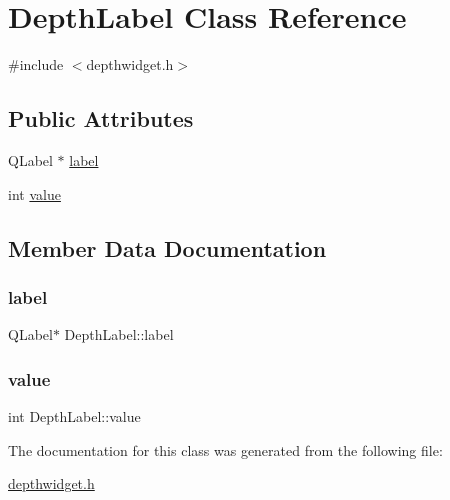 \hypertarget{class_depth_label}{}\section{Depth\+Label Class Reference}
\label{class_depth_label}


{\ttfamily \#include $<$depthwidget.\+h$>$}

\subsection*{Public Attributes}
\begin{DoxyCompactItemize}
\item 
Q\+Label $\ast$ \mbox{\hyperlink{class_depth_label_a088e21b75c822379eb2b853fbfd6c918}{label}}
\item 
int \mbox{\hyperlink{class_depth_label_a3e25eb8a8714546d633315adbe1cb446}{value}}
\end{DoxyCompactItemize}


\subsection{Member Data Documentation}
\mbox{\label{class_depth_label_a088e21b75c822379eb2b853fbfd6c918}} 
\subsubsection{\texorpdfstring{label}{label}}
{\footnotesize\ttfamily Q\+Label$\ast$ Depth\+Label\+::label}

\mbox{\label{class_depth_label_a3e25eb8a8714546d633315adbe1cb446}} 
\subsubsection{\texorpdfstring{value}{value}}
{\footnotesize\ttfamily int Depth\+Label\+::value}



The documentation for this class was generated from the following file\+:\begin{DoxyCompactItemize}
\item 
\mbox{\hyperlink{depthwidget_8h}{depthwidget.\+h}}\end{DoxyCompactItemize}
